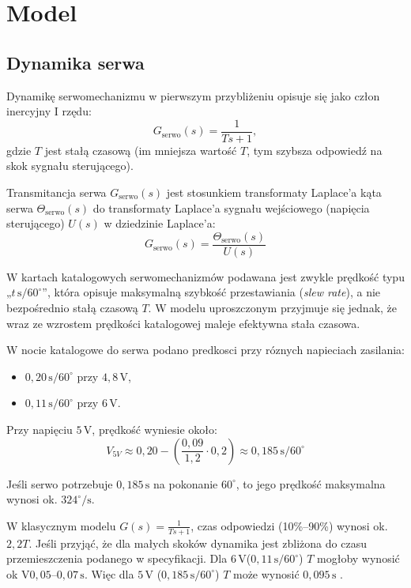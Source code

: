 \section{Model}

\subsection{Dynamika serwa}

Dynamikę serwomechanizmu w pierwszym przybliżeniu opisuje się jako człon
inercyjny I rzędu:
\begin{equation}
  G_{\mathrm{serwo}}(s)=\frac{1}{Ts+1},
\end{equation}
gdzie $T$ jest stałą czasową (im mniejsza wartość $T$, tym szybsza odpowiedź na
skok sygnału sterującego).

Transmitancja serwa $G_{\mathrm{serwo}}(s)$ jest stosunkiem transformaty Laplace'a 
kąta serwa $\Theta_{\mathrm{serwo}}(s)$ do transformaty Laplace'a sygnału wejściowego 
(napięcia sterującego) $U(s)$ w dziedzinie Laplace'a:
\begin{equation}
  G_{\mathrm{serwo}}(s) = \frac{\Theta_{\mathrm{serwo}}(s)}{U(s)}
\end{equation}

W kartach katalogowych serwomechanizmów podawana jest zwykle prędkość typu
„$t\,\mathrm{s}/60^{\circ}$”, która opisuje maksymalną szybkość przestawiania
(\emph{slew rate}), a nie bezpośrednio stałą czasową $T$. W modelu uproszczonym
przyjmuje się jednak, że wraz ze wzrostem prędkości katalogowej maleje efektywna
stała czasowa.

W nocie katalogowe do serwa podano predkosci przy róznych napieciach zasilania:
\begin{itemize}
  \item $0{,}20\,\mathrm{s}/60^{\circ}$ przy $4{,}8\,\mathrm{V}$,
  \item $0{,}11\,\mathrm{s}/60^{\circ}$ przy $6\,\mathrm{V}$.
\end{itemize}


Przy napięciu $5\,\mathrm{V}$, 
prędkość wyniesie około:
\begin{equation}
V_{5V}\approx 0{,}20 - \left(\frac{0{,}09}{1{,}2} \cdot 0{,}2\right) \approx 0{,}185\,\mathrm{s}/60^{\circ}
\end{equation}

Jeśli serwo potrzebuje $0{,}185\,\mathrm{s}$ na pokonanie $60^{\circ}$, to jego 
prędkość maksymalna wynosi ok. $324^{\circ}/\mathrm{s}$.

W klasycznym modelu $G(s)=\frac{1}{Ts+1}$, czas odpowiedzi (10\%--90\%) wynosi 
ok. $2{,}2T$. Jeśli przyjąć, że dla małych skoków dynamika jest zbliżona do czasu 
przemieszczenia podanego w specyfikacji. Dla
$6\,\mathrm{V}$($0{,}11\,\mathrm{s}/60^{\circ}$) $T$ mogłoby wynosić ok
$\mathrm{V}$$0{,}05$--$0{,}07\,\mathrm{s}$. Więc dla $5\,\mathrm{V}$
($0{,}185\,\mathrm{s}/60^{\circ}$) $T$ może wynosić $0{,}095\,\mathrm{s}$ .

